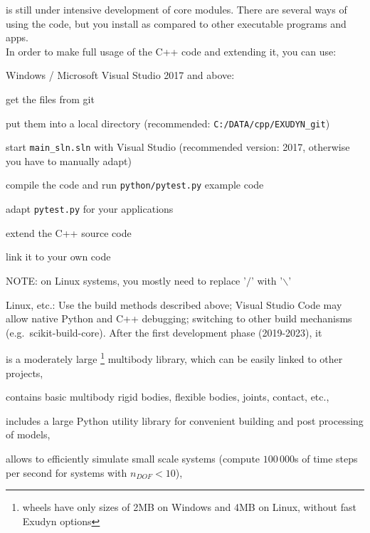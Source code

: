 \codeName is still under intensive development of core modules.
There are several ways of using the code, but you  install \codeName as compared to other executable programs and apps.
\vspace{6pt}\\
In order to make full usage of the C++ code and extending it, you can use:
\bi
  \item Windows / Microsoft Visual Studio 2017 and above:
  \bi
    \item get the files from git
    \item put them into a local directory (recommended: \texttt{C:/DATA/cpp/EXUDYN\_git})
    \item start \texttt{main\_sln.sln} with Visual Studio (recommended version: 2017, otherwise you have to manually adapt)
    \item compile the code and run \texttt{python/pytest.py} example code
    \item adapt \texttt{pytest.py} for your applications
    \item extend the C++ source code
    \item link it to your own code
    \item NOTE: on Linux systems, you mostly need to replace '$/$' with '$\backslash$'
  \ei
  \item Linux, etc.: Use the build methods described above; Visual Studio Code may allow native Python and C++ debugging; switching to other build mechanisms (e.g.\ scikit-build-core).
\ei
%
After the first development phase (2019-2023), it
\bi
  \item is a moderately large \footnote{wheels have only sizes of 2MB on Windows and 4MB on Linux, without fast Exudyn options} multibody library, which can be easily linked to other projects,
  \item contains basic multibody rigid bodies, flexible bodies, joints, contact, etc.,
  \item includes a large Python utility library for convenient building and post processing of models,
  \item allows to efficiently simulate small scale systems (compute $100\,000$s of time steps per second for systems with $n_{DOF}<10$),
